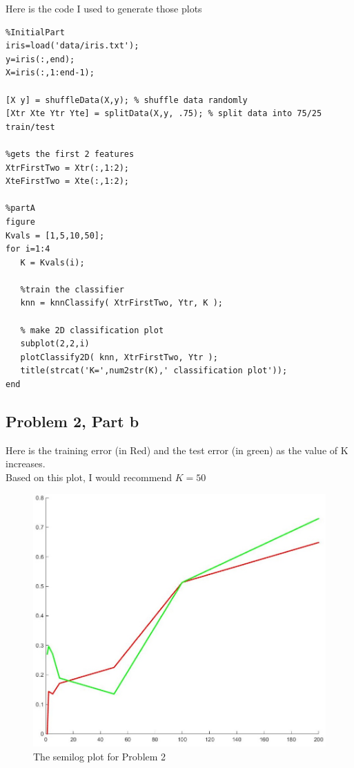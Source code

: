 \documentclass[11pt,psfig]{article}
\begin{document}
\newpage

Here is the code I used to generate those plots

\begin{verbatim}
%InitialPart
iris=load('data/iris.txt'); 
y=iris(:,end); 
X=iris(:,1:end-1);

[X y] = shuffleData(X,y); % shuffle data randomly
[Xtr Xte Ytr Yte] = splitData(X,y, .75); % split data into 75/25 train/test

%gets the first 2 features
XtrFirstTwo = Xtr(:,1:2);
XteFirstTwo = Xte(:,1:2);

%partA
figure
Kvals = [1,5,10,50];
for i=1:4
   K = Kvals(i);
   
   %train the classifier
   knn = knnClassify( XtrFirstTwo, Ytr, K );
   
   % make 2D classification plot
   subplot(2,2,i)
   plotClassify2D( knn, XtrFirstTwo, Ytr );
   title(strcat('K=',num2str(K),' classification plot'));
end
\end{verbatim}

\subsection*{Problem 2, Part b}

Here is the training error (in Red) and the test error (in green) as the value of K increases. \\
Based on this plot, I would recommend $K=50$

\begin{figure}[H]
\centering
\includegraphics[width=\columnwidth]{prob2bPlot.jpg}
\caption{The semilog plot for Problem 2}
\end{figure}
\end{document}
